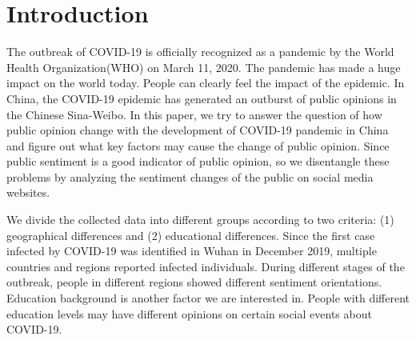 \documentclass[sigconf, nonacm=true]{acmart}
\begin{document}
\begin{comment}


\begin{CCSXML}
<ccs2012>
<concept>
<concept_id>10003456</concept_id>
<concept_desc>Social and professional topics</concept_desc>
<concept_significance>500</concept_significance>
</concept>
<concept>
<concept_id>10010405.10010455.10010461</concept_id>
<concept_desc>Applied computing~Sociology</concept_desc>
<concept_significance>500</concept_significance>
</concept>
</ccs2012>
\end{CCSXML}

\ccsdesc[500]{Social and professional topics}
\ccsdesc[500]{Applied computing~Sociology}
\end{comment}

\maketitle

\section{Introduction}
The outbreak of COVID-19 is officially recognized as a pandemic by the World Health Organization(WHO) on March 11, 2020. The pandemic has made a huge impact on the world today. People can clearly feel the impact of the epidemic. In China, the COVID-19 epidemic has generated an outburst of public opinions in the Chinese Sina-Weibo. In this paper, we try to answer the question of how public opinion change with the development of COVID-19 pandemic in China and figure out what key factors may cause the change of public opinion. Since public sentiment is a good indicator of public opinion, so we disentangle these problems by analyzing the sentiment changes of the public on social media websites.

We divide the collected data into different groups according to two criteria: 
(1) geographical differences and (2) educational differences.
Since the first case infected by COVID-19 was identified in Wuhan in December 2019, multiple countries and regions reported infected individuals.
During different stages of the outbreak, people in different regions showed different sentiment orientations. 
Education background is another factor we are interested in. People with different education levels may have different opinions on certain social events about COVID-19. 
\end{document}
